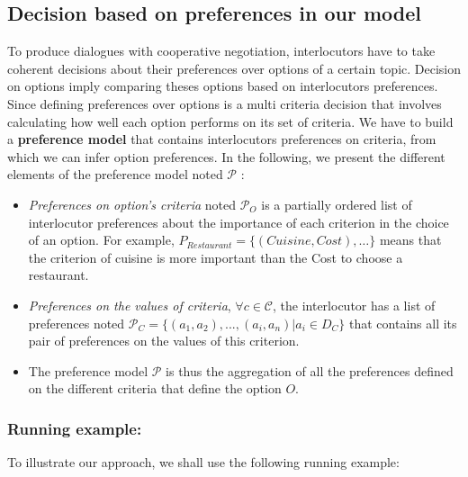 \documentclass{llncs}
\begin{document}
\subsection{Decision based on preferences in our model}
\par To produce  dialogues with cooperative negotiation, interlocutors have to take coherent decisions about their preferences over options of a certain topic. Decision on options imply comparing theses options based on interlocutors preferences.  
 Since defining preferences over options is a multi criteria decision that involves calculating how well each option performs on its set of criteria. We have to build a \textbf{preference model }that contains interlocutors preferences on criteria, from which we can infer option preferences.  
In the following, we present the different elements of the preference model noted \textbf{$\mathcal{P}$} : 
\begin{itemize}
	\item \textit{Preferences on option's criteria} noted $\mathcal{P}_O$ is a partially ordered list of interlocutor preferences about the importance of each criterion in the choice of an option. For example, $ P_{Restaurant} = \{(Cuisine, Cost), \ldots\} $
	means that the criterion of cuisine is more important than the Cost to choose a restaurant. 
	\item  \textit{Preferences on the values of criteria}, $\forall c \in \mathcal{C}$, the interlocutor has a list of preferences noted $\mathcal{P}_C = \{(a_1, a_2), ..., (a_i,a_n) | a_i \in D_C \}$ that contains all its pair of preferences on the values of this criterion. 
	\item The preference model \textbf{$\mathcal{P}$} is thus the aggregation of all the preferences defined on the different criteria that define the option $O$. 

\end{itemize}
 \subsubsection{Running example:} 
 To illustrate our approach, we shall use the following running example:
 
\end{document}
